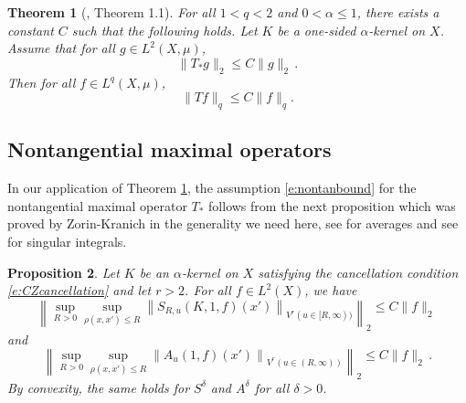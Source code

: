 \documentclass[12pt,reqno,a4paper,dvipsnames]{amsart}
\theoremstyle{plain}
\newtheorem{theorem}{Theorem}
\newtheorem{prop}[theorem]{Proposition}
\theoremstyle{definition}
\numberwithin{theorem}{section}
\numberwithin{equation}{section}
\begin{document}
    \begin{theorem}[\cite{beckeretal}, Theorem 1.1]
    \label{t:gen Carleson}
        For all $1<q < 2$ and $0<\alpha\leq 1$, there exists a constant $C$ such that the following holds.
        Let $K$ be a one-sided $\alpha$-kernel on $X$. 
        Assume that for all $g \in L^2(X, \mu)$, \begin{equation}\label{e:nontanbound}
            \|T_{*}g\|_{2} \leq C \|g\|_2\,.
        \end{equation}
        Then for all $f \in L^q(X, \mu)$,
        \begin{equation}
            \label{e:strong}
            \|Tf\|_q \le C \|f\|_q.
        \end{equation}
    \end{theorem}

    \subsection{Nontangential maximal operators}
    In our application of Theorem \ref{t:gen Carleson}, the assumption \eqref{e:nontanbound} for the nontangential maximal operator $T_*$ follows from the next proposition which was proved by Zorin-Kranich in the generality we need here, see \cite[Theorem 1.3]{zk-var-trunc} for averages and see \cite[Theorem 1.8]{zk-var-trunc} for singular integrals.

\begin{prop}
    \label{p:NontVar}
    Let $K$ be an $\alpha$-kernel on $X$ satisfying the cancellation condition \eqref{e:CZcancellation} and let $r > 2$. For all $f \in L^2(X)$, we have
    $$
    \left\|\sup_{R > 0} \sup_{\rho(x,x') \leq R} \left\| S_{R, u}(K, 1, f)(x')\right\|_{V^r(u \in [R, \infty))}\right\|_2
    \leq C \|f\|_2\,
    $$
    and
    $$
    \left\|\sup_{R>0} \sup_{\rho(x,x') \leq R} \left\| A_u(1, f)(x') \right\|_{V^r(u \in (R, \infty))}\right\|_2 
    \leq C \|f\|_2\,.
    $$
    By convexity, the same holds for $S^\delta$ and $A^\delta$ for all $\delta > 0$.
\end{prop}
\end{document}
